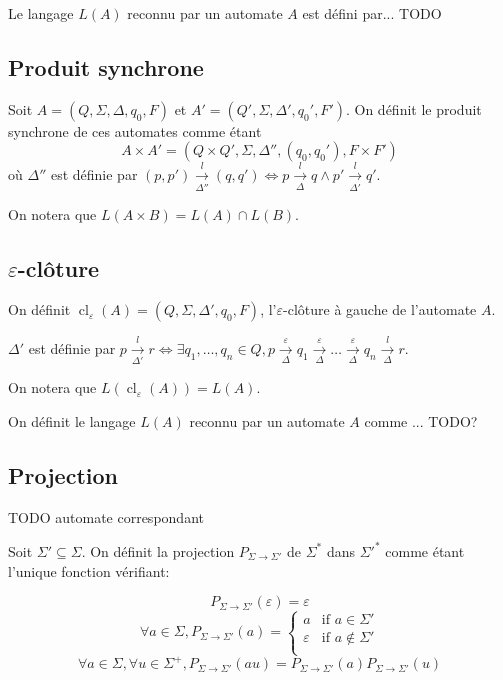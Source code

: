 \documentclass[10pt,a4paper]{article}
\begin{document}
Le langage $L(A)$ reconnu par un automate $A$ est d\'efini par... TODO


\subsection{Produit synchrone}

Soit $A = (Q, \Sigma, \Delta, q_0, F)$ et $A' = (Q', \Sigma, \Delta', q_0', F')$. On définit le produit synchrone de ces automates comme \'etant $$A\times A' = (Q \times Q', \Sigma, \Delta'', (q_0, q_0'), F\times F')$$ o\`u $\Delta''$ est d\'efinie par $(p,p')\overset{l}{\underset{\Delta''}{\to}}(q,q') \iff p\overset{l}{\underset{\Delta}{\to}}q \land p'\overset{l}{\underset{\Delta'}{\to}}q'$.

On notera que $L(A\times B) = L(A) \cap L(B)$.

\subsection{$\varepsilon$-clôture}

On définit  $\operatorname{cl}_\varepsilon(A) = (Q, \Sigma, \Delta', q_0, F)$, l'$\varepsilon$-clôture \`a gauche de l'automate $A$.

$\Delta'$ est d\'efinie par $p \overset{l}{\underset{\Delta'}{\to}} r \iff \exists q_1,\dots,q_n \in Q, p \overset{\varepsilon}{\underset{\Delta}{\to}} q_1 \overset{\varepsilon}{\underset{\Delta}{\to}} \dots \overset{\varepsilon}{\underset{\Delta}{\to}} q_n \overset{l}{\underset{\Delta}{\to}} r$.

On notera que $L(\operatorname{cl}_\varepsilon(A))=L(A)$.

On d\'efinit le langage $L(A)$ reconnu par un automate $A$ comme ... TODO?

\subsection{Projection}
TODO automate correspondant

Soit $\Sigma'\subseteq \Sigma$. On d\'efinit la projection $P_{\Sigma \to \Sigma'}$ de $\Sigma^*$ dans $\Sigma'^*$ comme \'etant l'unique fonction v\'erifiant:

$$P_{\Sigma \to \Sigma'}(\varepsilon) = \varepsilon$$
$$\forall a \in \Sigma, P_{\Sigma \to \Sigma'}(a)=\left\{\begin{array}{ll}
a &\text{if } a\in \Sigma'\\
\varepsilon &\text{if } a\not\in \Sigma'\\
\end{array}\right.$$
$$\forall a \in \Sigma, \forall u \in \Sigma^+, P_{\Sigma \to \Sigma'}(au)=P_{\Sigma \to \Sigma'}(a)P_{\Sigma \to \Sigma'}(u)$$
\end{document}
